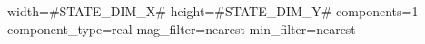 width=#STATE_DIM_X#
height=#STATE_DIM_Y#
components=1
component_type=real
mag_filter=nearest
min_filter=nearest
